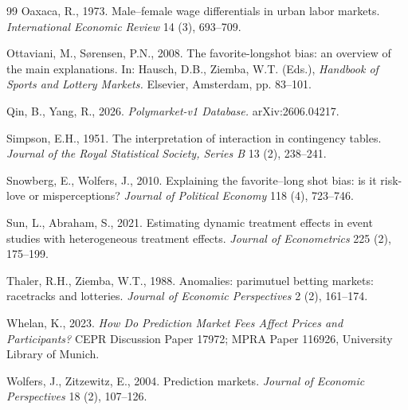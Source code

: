 \documentclass[preprint,12pt,authoryear]{elsarticle}
\begin{document}
\begin{thebibliography}{99}
Oaxaca, R., 1973.
Male--female wage differentials in urban labor markets.
\emph{International Economic Review} 14 (3), 693--709.

Ottaviani, M., S{\o}rensen, P.N., 2008.
The favorite-longshot bias: an overview of the main explanations.
In: Hausch, D.B., Ziemba, W.T. (Eds.), \emph{Handbook of Sports and Lottery
Markets.} Elsevier, Amsterdam, pp. 83--101.

Qin, B., Yang, R., 2026.
\emph{Polymarket-v1 Database.} arXiv:2606.04217.

Simpson, E.H., 1951.
The interpretation of interaction in contingency tables.
\emph{Journal of the Royal Statistical Society, Series B} 13 (2), 238--241.

Snowberg, E., Wolfers, J., 2010.
Explaining the favorite--long shot bias: is it risk-love or misperceptions?
\emph{Journal of Political Economy} 118 (4), 723--746.

Sun, L., Abraham, S., 2021.
Estimating dynamic treatment effects in event studies with heterogeneous
treatment effects.
\emph{Journal of Econometrics} 225 (2), 175--199.

Thaler, R.H., Ziemba, W.T., 1988.
Anomalies: parimutuel betting markets: racetracks and lotteries.
\emph{Journal of Economic Perspectives} 2 (2), 161--174.

Whelan, K., 2023.
\emph{How Do Prediction Market Fees Affect Prices and Participants?}
CEPR Discussion Paper 17972; MPRA Paper 116926, University Library of Munich.

Wolfers, J., Zitzewitz, E., 2004.
Prediction markets.
\emph{Journal of Economic Perspectives} 18 (2), 107--126.

\end{thebibliography}
\end{document}
